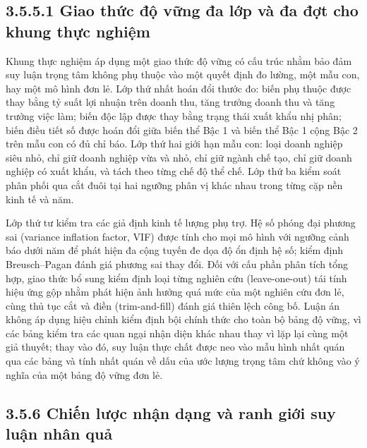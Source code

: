 \documentclass[
  a4paper,
  13pt]{extreport}
\begin{document}
\hypertarget{giao-thux1ee9c-ux111ux1ed9-vux1eefng-ux111a-lux1edbp-vuxe0-ux111a-ux111ux1ee3t-cho-khung-thux1ef1c-nghiux1ec7m}{%
\subsection{3.5.5.1 Giao thức độ vững đa lớp và đa đợt cho khung thực
nghiệm}\label{giao-thux1ee9c-ux111ux1ed9-vux1eefng-ux111a-lux1edbp-vuxe0-ux111a-ux111ux1ee3t-cho-khung-thux1ef1c-nghiux1ec7m}}

Khung thực nghiệm áp dụng một giao thức độ vững có cấu trúc nhằm bảo đảm
suy luận trọng tâm không phụ thuộc vào một quyết định đo lường, một mẫu
con, hay một mô hình đơn lẻ. Lớp thứ nhất hoán đổi thước đo: biến phụ
thuộc được thay bằng tỷ suất lợi nhuận trên doanh thu, tăng trưởng doanh
thu và tăng trưởng việc làm; biến độc lập được thay bằng trạng thái xuất
khẩu nhị phân; biến điều tiết số được hoán đổi giữa biến thể Bậc 1 và
biến thể Bậc 1 cộng Bậc 2 trên mẫu con có đủ chỉ báo. Lớp thứ hai giới
hạn mẫu con: loại doanh nghiệp siêu nhỏ, chỉ giữ doanh nghiệp vừa và
nhỏ, chỉ giữ ngành chế tạo, chỉ giữ doanh nghiệp có xuất khẩu, và tách
theo từng chế độ thể chế. Lớp thứ ba kiểm soát phân phối qua cắt đuôi
tại hai ngưỡng phân vị khác nhau trong từng cặp nền kinh tế và năm.

Lớp thứ tư kiểm tra các giả định kinh tế lượng phụ trợ. Hệ số phóng đại
phương sai (variance inflation factor, VIF) được tính cho mọi mô hình
với ngưỡng cảnh báo dưới năm để phát hiện đa cộng tuyến đe dọa độ ổn
định hệ số; kiểm định Breusch--Pagan đánh giá phương sai thay đổi. Đối
với cấu phần phân tích tổng hợp, giao thức bổ sung kiểm định loại từng
nghiên cứu (leave-one-out) tái tính hiệu ứng gộp nhằm phát hiện ảnh
hưởng quá mức của một nghiên cứu đơn lẻ, cùng thủ tục cắt và điền
(trim-and-fill) đánh giá thiên lệch công bố. Luận án không áp dụng hiệu
chỉnh kiểm định bội chính thức cho toàn bộ bảng độ vững, vì các bảng
kiểm tra các quan ngại nhận diện khác nhau thay vì lặp lại cùng một giả
thuyết; thay vào đó, suy luận thực chất được neo vào mẫu hình nhất quán
qua các bảng và tính nhất quán về dấu của ước lượng trọng tâm chứ không
vào ý nghĩa của một bảng độ vững đơn lẻ.

\hypertarget{chiux1ebfn-lux1b0ux1ee3c-nhux1eadn-dux1ea1ng-vuxe0-ranh-giux1edbi-suy-luux1eadn-nhuxe2n-quux1ea3}{%
\subsection{3.5.6 Chiến lược nhận dạng và ranh giới suy luận nhân
quả}\label{chiux1ebfn-lux1b0ux1ee3c-nhux1eadn-dux1ea1ng-vuxe0-ranh-giux1edbi-suy-luux1eadn-nhuxe2n-quux1ea3}}
\end{document}
